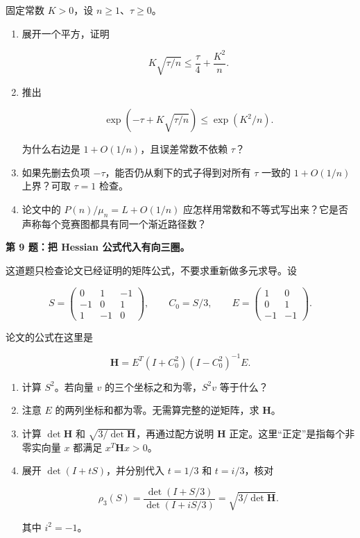 \documentclass[11pt,a4paper]{article}
\begin{document}
固定常数 \(K>0\)，设 \(n\ge1\)、\(\tau\ge0\)。

\begin{enumerate}
\def\labelenumi{\arabic{enumi}.}
\item
  展开一个平方，证明

  \[K\sqrt{\tau/n}\le\frac{\tau}{4}+\frac{K^2}{n}.\]
\item
  推出

  \[\exp\!\left(-\tau+K\sqrt{\tau/n}\right)
  \le\exp(K^2/n).\]

  为什么右边是 \(1+O(1/n)\)，且误差常数不依赖 \(\tau\)？
\item
  如果先删去负项 \(-\tau\)，能否仍从剩下的式子得到对所有 \(\tau\) 一致的 \(1+O(1/n)\) 上界？可取 \(\tau=1\) 检查。
\item
  论文中的 \(P(n)/\mu_n=L+O(1/n)\) 应怎样用常数和不等式写出来？它是否声称每个竞赛图都具有同一个渐近路径数？
\end{enumerate}

\textbf{第 9 题：把 Hessian 公式代入有向三圈。}

这道题只检查论文已经证明的矩阵公式，不要求重新做多元求导。设

\[S=\begin{pmatrix}0&1&-1\\-1&0&1\\1&-1&0\end{pmatrix},
\qquad C_0=S/3,
\qquad
E=\begin{pmatrix}1&0\\0&1\\-1&-1\end{pmatrix}.\]

论文的公式在这里是

\[\mathbf H=E^T(I+C_0^2)(I-C_0^2)^{-1}E.\]

\begin{enumerate}
\def\labelenumi{\arabic{enumi}.}
\item
  计算 \(S^2\)。若向量 \(v\) 的三个坐标之和为零，\(S^2v\) 等于什么？
\item
  注意 \(E\) 的两列坐标和都为零。无需算完整的逆矩阵，求 \(\mathbf H\)。
\item
  计算 \(\det\mathbf H\) 和 \(\sqrt{3/\det\mathbf H}\)，再通过配方说明 \(\mathbf H\) 正定。这里``正定''是指每个非零实向量 \(x\) 都满足 \(x^T\mathbf Hx>0\)。
\item
  展开 \(\det(I+tS)\)，并分别代入 \(t=1/3\) 和 \(t=i/3\)，核对

  \[\rho_3(S)=\frac{\det(I+S/3)}{\det(I+iS/3)}
  =\sqrt{3/\det\mathbf H}.\]

  其中 \(i^2=-1\)。
\end{enumerate}
\end{document}
